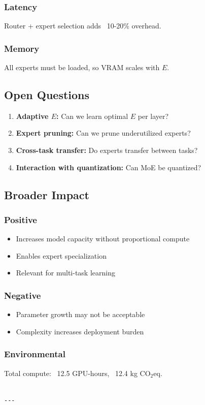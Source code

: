\subsubsection{Latency}
Router + expert selection adds ~10-20\% overhead.

\subsubsection{Memory}
All experts must be loaded, so VRAM scales with $E$.

\subsection{Open Questions}

\begin{enumerate}
\item \textbf{Adaptive $E$:} Can we learn optimal $E$ per layer?
\item \textbf{Expert pruning:} Can we prune underutilized experts?
\item \textbf{Cross-task transfer:} Do experts transfer between tasks?
\item \textbf{Interaction with quantization:} Can MoE be quantized?

\end{enumerate}
\subsection{Broader Impact}

\subsubsection{Positive}
\begin{itemize}
\item Increases model capacity without proportional compute
\item Enables expert specialization
\item Relevant for multi-task learning

\end{itemize}
\subsubsection{Negative}
\begin{itemize}
\item Parameter growth may not be acceptable
\item Complexity increases deployment burden

\end{itemize}
\subsubsection{Environmental}
Total compute: ~12.5 GPU-hours, ~12.4 kg CO$_2$eq.
\begin{lstlisting}

---
\end{lstlisting}